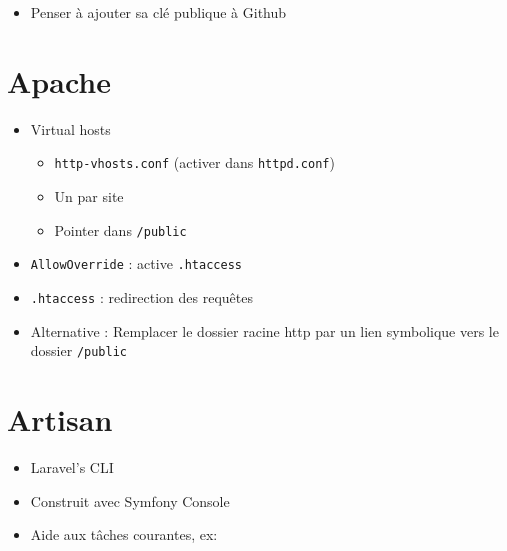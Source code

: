 \begin{itemize}
\tightlist
\item
  Penser à ajouter sa clé publique à Github
\end{itemize}

\hypertarget{apache}{%
\section{Apache}\label{apache}}

\begin{itemize}
\tightlist
\item
  Virtual hosts

  \begin{itemize}
  \tightlist
  \item
    \textenglish{\texttt{http-vhosts.conf}} (activer dans
    \textenglish{\texttt{httpd.conf}})
  \item
    Un par site
  \item
    Pointer dans \textenglish{\texttt{/public}}
  \end{itemize}
\item
  \textenglish{\texttt{AllowOverride}} : active
  \textenglish{\texttt{.htaccess}}
\item
  \textenglish{\texttt{.htaccess}} : redirection des requêtes
\item
  Alternative : Remplacer le dossier racine http par un lien symbolique
  vers le dossier \textenglish{\texttt{/public}}
\end{itemize}

\hypertarget{artisan}{%
\section{Artisan}\label{artisan}}

\begin{itemize}
\tightlist
\item
  Laravel's CLI
\item
  Construit avec Symfony Console
\item
  Aide aux tâches courantes, ex:
\end{itemize}

\begin{english}

\begin{Shaded}
\begin{Highlighting}[]
 
 
 

 
\end{Highlighting}
\end{Shaded}

\end{english}

